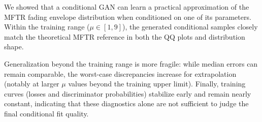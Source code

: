 We showed that a conditional GAN can learn a practical approximation of the MFTR fading envelope distribution when conditioned on one of its parameters. Within the training range ($\mu\in[1,9]$), the generated conditional samples closely match the theoretical MFTR reference in both the QQ plots and distribution shape.

Generalization beyond the training range is more fragile: while median errors can remain comparable, the worst-case discrepancies increase for extrapolation (notably at larger $\mu$ values beyond the training upper limit). Finally, training curves (losses and discriminator probabilities) stabilize early and remain nearly constant, indicating that these diagnostics alone are not sufficient to judge the final conditional fit quality.
